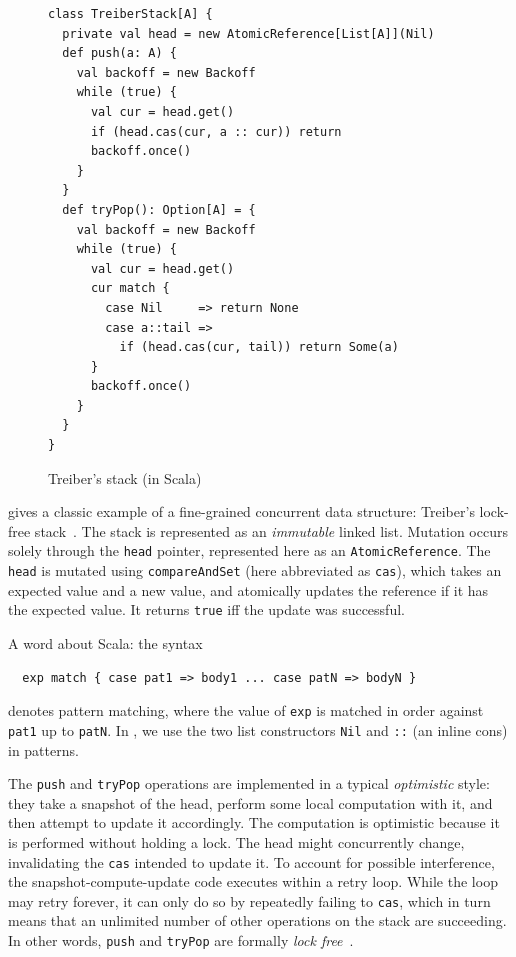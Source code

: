 \documentclass[preprint,nocopyrightspace]{sigplanconf}
\begin{document}
\begin{figure}
\begin{lstlisting}[frame=single]
class TreiberStack[A] {
  private val head = new AtomicReference[List[A]](Nil)
  def push(a: A) {
    val backoff = new Backoff
    while (true) {
      val cur = head.get()
      if (head.cas(cur, a :: cur)) return
      backoff.once()
    }
  }
  def tryPop(): Option[A] = {
    val backoff = new Backoff
    while (true) {
      val cur = head.get() 
      cur match {
        case Nil     => return None
        case a::tail => 
          if (head.cas(cur, tail)) return Some(a)
      }
      backoff.once()
    }
  }
}
\end{lstlisting}
\nocaptionrule
\caption{Treiber's stack (in Scala)}
\label{fig:classic-treiber}
\end{figure}

 gives a classic example of a fine-grained concurrent
data structure: Treiber's lock-free stack~\cite{?}.  The stack is represented as
an \emph{immutable} linked list.  Mutation occurs solely through the
\lstinline{head} pointer, represented here as an \lstinline{AtomicReference}.
The \lstinline{head} is mutated using \lstinline{compareAndSet} (here
abbreviated as \lstinline{cas}), which takes an expected value and a new value,
and atomically updates the reference if it has the expected value.  It returns
\lstinline{true} iff the update was successful.

A word about Scala: the syntax 
\begin{lstlisting}
  exp match { case pat1 => body1 ... case patN => bodyN }
\end{lstlisting}
denotes pattern matching, where the value of \lstinline{exp} is matched in order
against \lstinline{pat1} up to \lstinline{patN}.  In ,
we use the two list constructors \lstinline{Nil} and \lstinline{::} (an inline
cons) in patterns.

The \lstinline{push} and \lstinline{tryPop} operations are implemented in a
typical \emph{optimistic} style: they take a snapshot of the head, perform some
local computation with it, and then attempt to update it accordingly.  The
computation is optimistic because it is performed without holding a lock.  The
head might concurrently change, invalidating the \lstinline{cas} intended to
update it.  To account for possible interference, the snapshot-compute-update
code executes within a retry loop.  While the loop may retry forever, it can
only do so by repeatedly failing to \lstinline{cas}, which in turn means that an
unlimited number of other operations on the stack are succeeding.  In other
words, \lstinline{push} and \lstinline{tryPop} are formally \emph{lock
  free}~\cite{?}.
\end{document}
